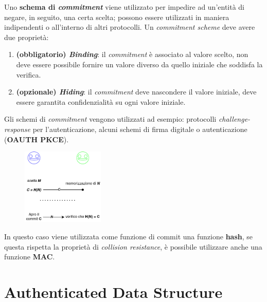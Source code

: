 \begin{flushleft}
    Uno \textbf{schema di \textit{commitment}} viene utilizzato per impedire ad un'entità di negare, in seguito, una certa scelta; possono essere utilizzati in maniera indipendenti o all'interno di altri protocolli. Un \textit{commitment scheme} deve avere due proprietà:
    \begin{enumerate}[nosep]
        \item \textbf{(obbligatorio) \textit{Binding}}: il \textit{commitment} è associato al valore scelto, non deve essere possibile fornire un valore diverso da quello iniziale che soddisfa la verifica.
        \item \textbf{(opzionale) \textit{Hiding}}: il \textit{commitment} deve nascondere il valore iniziale, deve essere garantita confidenzialità su ogni valore iniziale.
    \end{enumerate}

    Gli schemi di \textit{commitment} vengono utilizzati ad esempio: protocolli \textit{challenge-response} per l'autenticazione, alcuni schemi di firma digitale o autenticazione (\textbf{OAUTH PKCE}).

    \begin{figure}[h]
        \centering
        \includegraphics[width=0.35\textwidth]{img/commit_scheme.png}
    \end{figure}

    In questo caso viene utilizzata come funzione di commit una funzione \textbf{hash}, se questa rispetta la proprietà di \textit{collision resistance}, è possibile utilizzare anche una funzione \textbf{MAC}.
\end{flushleft}

\section{Authenticated Data Structure}

